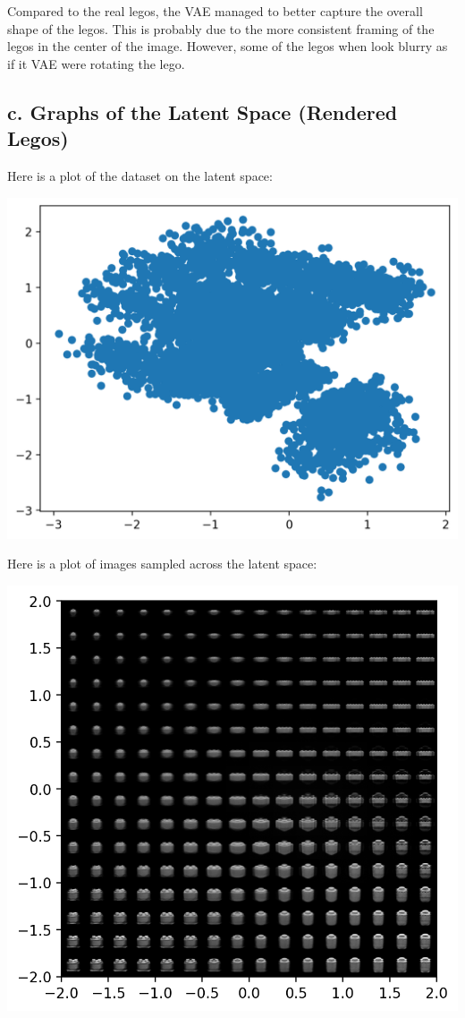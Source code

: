 \documentclass[]{article}
\begin{document}
Compared to the real legos, the VAE managed to better capture
the overall shape of the legos. 
This is probably due to the more consistent framing of the legos
in the center of the image.
However, some of the legos when
look blurry as if it VAE were rotating the lego.

\subsection*{c. Graphs of the Latent Space (Rendered Legos)}

Here is a plot of the dataset on the latent space:

\begin{center}
  \includegraphics[scale=0.75]{latent_space-lego-blender-4}
\end{center}

Here is a plot of images sampled across the latent space:

\begin{center}
  \includegraphics[scale=1]{latent_space_examples-lego-blender-4}
\end{center}
\end{document}

